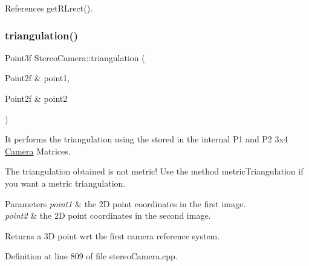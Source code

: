 References get\+R\+Lrect().

\mbox{\label{classStereoCamera_a3c8ef84424fa111c63437a3db8f04333}} 
\subsubsection{\texorpdfstring{triangulation()}{triangulation()}\hspace{0.1cm}{\footnotesize\ttfamily [1/2]}}
{\footnotesize\ttfamily Point3f Stereo\+Camera\+::triangulation (\begin{DoxyParamCaption}\item[{Point2f \&}]{point1,  }\item[{Point2f \&}]{point2 }\end{DoxyParamCaption})}



It performs the triangulation using the stored in the internal P1 and P2 3x4 \mbox{\hyperlink{classCamera}{Camera}} Matrices. 

The triangulation obtained is not metric! Use the method metric\+Triangulation if you want a metric triangulation. 
\begin{DoxyParams}{Parameters}
{\em point1} & the 2D point coordinates in the first image. \\
\hline
{\em point2} & the 2D point coordinates in the second image. \\
\hline
\end{DoxyParams}
\begin{DoxyReturn}{Returns}
a 3D point wrt the first camera reference system. 
\end{DoxyReturn}


Definition at line 809 of file stereo\+Camera.\+cpp.


